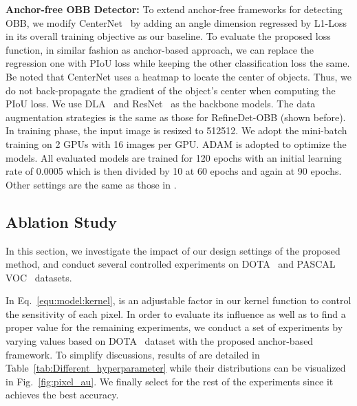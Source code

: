 \noindent\textbf{Anchor-free OBB Detector:}
\label{approach:anchorfree}
To extend anchor-free frameworks for detecting OBB, we modify CenterNet~\cite{Zhou2019OAP} by adding an angle dimension regressed by L1-Loss in its overall training objective as our baseline. To evaluate the proposed loss function, in similar fashion as anchor-based approach, we can replace the regression one with PIoU loss  while keeping the other classification loss  the same. Be noted that CenterNet uses a heatmap to locate the center of objects. Thus, we do not back-propagate the gradient of the object's center when computing the PIoU loss. We use DLA~\cite{Yu2018Deep} and ResNet~\cite{He2016DRL} as the backbone models. The data augmentation strategies is the same as those for RefineDet-OBB (shown before). In training phase, the input image is resized to 512512. We adopt the mini-batch training on 2 GPUs with 16 images per GPU. ADAM is adopted to optimize the models. All evaluated models are trained for 120 epochs with an initial learning rate of 0.0005 which is then divided by 10 at 60 epochs and again at 90 epochs. Other settings are the same as those in \cite{Zhou2019OAP}.

\subsection{Ablation Study}
\label{exp:evaluation:anchorbased}
In this section, we investigate the impact of our design settings of the proposed method, and conduct several controlled experiments on DOTA~\cite{Xia2018DAS} and PASCAL VOC~\cite{Everingham2015TPV} datasets.

In Eq.~\ref{equ:model:kernel},  is an adjustable factor in our kernel function to control the sensitivity of each pixel. In order to evaluate its influence as well as to find a proper value for the remaining experiments, we conduct a set of experiments by varying  values based on DOTA~\cite{Xia2018DAS} dataset with the proposed anchor-based framework. To simplify discussions, results of  are detailed in Table~\ref{tab:Different_hyperparameter} while their distributions can be visualized in Fig.~\ref{fig:pixel_au}. We finally select  for the rest of the experiments since it achieves the best accuracy.

